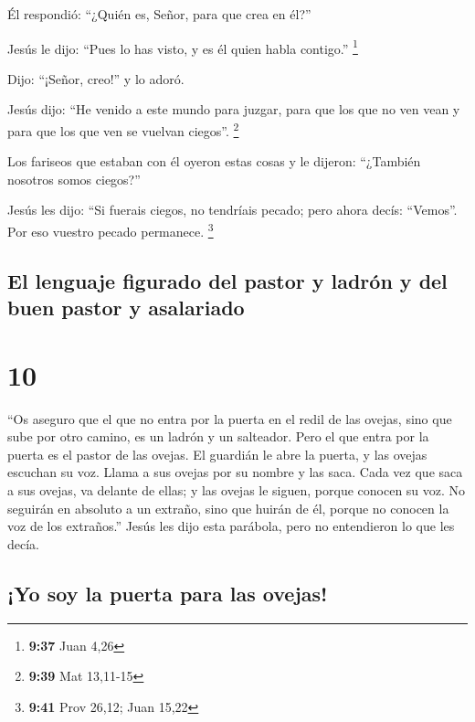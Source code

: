  Él respondió: ``¿Quién es, Señor, para que crea en él?''

 Jesús le dijo: ``Pues lo has visto, y es él quien habla
contigo.'' \footnote{\textbf{9:37} Juan 4,26}

 Dijo: ``¡Señor, creo!'' y lo adoró.

 Jesús dijo: ``He venido a este mundo para juzgar, para
que los que no ven vean y para que los que ven se vuelvan ciegos''.
\footnote{\textbf{9:39} Mat 13,11-15}

 Los fariseos que estaban con él oyeron estas cosas y le
dijeron: ``¿También nosotros somos ciegos?''

 Jesús les dijo: ``Si fuerais ciegos, no tendríais
pecado; pero ahora decís: ``Vemos''. Por eso vuestro pecado permanece.
\footnote{\textbf{9:41} Prov 26,12; Juan 15,22}

\hypertarget{el-lenguaje-figurado-del-pastor-y-ladruxf3n-y-del-buen-pastor-y-asalariado}{%
\subsection{El lenguaje figurado del pastor y ladrón y del buen pastor y
asalariado}\label{el-lenguaje-figurado-del-pastor-y-ladruxf3n-y-del-buen-pastor-y-asalariado}}

\hypertarget{section-9}{%
\section{10}\label{section-9}}

 ``Os aseguro que el que no entra por la puerta en el
redil de las ovejas, sino que sube por otro camino, es un ladrón y un
salteador.  Pero el que entra por la puerta es el pastor
de las ovejas.  El guardián le abre la puerta, y las
ovejas escuchan su voz. Llama a sus ovejas por su nombre y las saca.
 Cada vez que saca a sus ovejas, va delante de ellas; y
las ovejas le siguen, porque conocen su voz.  No seguirán
en absoluto a un extraño, sino que huirán de él, porque no conocen la
voz de los extraños.''  Jesús les dijo esta parábola, pero
no entendieron lo que les decía.

\hypertarget{yo-soy-la-puerta-para-las-ovejas}{%
\subsection{¡Yo soy la puerta para las
ovejas!}\label{yo-soy-la-puerta-para-las-ovejas}}


